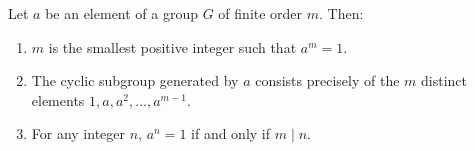 Let $a$ be an element of a group $G$ of finite order $m$. Then:

\begin{enumerate}
\item[(1)] $m$ is the smallest positive integer such that $a^m = 1$.
\item[(2)] The cyclic subgroup generated by $a$ consists precisely of the $m$ distinct elements $1, a, a^2, \ldots, a^{m-1}$.
\item[(3)] For any integer $n$, $a^n = 1$ if and only if $m \mid n$.
\end{enumerate}
